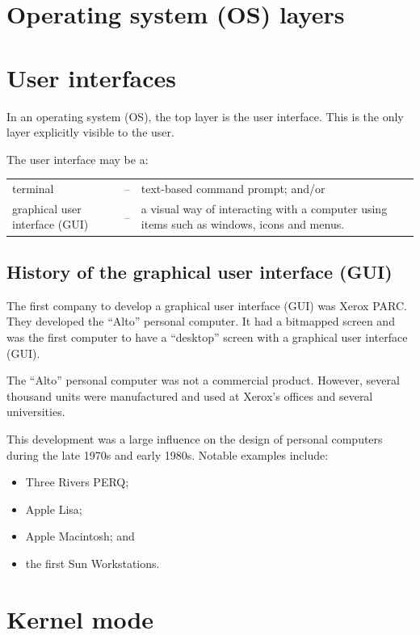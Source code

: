\documentclass[a4paper]{systems-software}
\begin{document}
\section{Operating system (OS) layers}

\section*{User interfaces}

In an operating system (OS), the top layer is the user interface. This is the only layer explicitly visible to the user.

The user interface may be a:
\begin{longtabu} to \textwidth {X[6,l] X[1,c] X[10,l]}
	\textbullet terminal & -- & text-based command prompt; and/or
	\\
	\textbullet graphical user interface (GUI) & -- & a visual way of interacting with a computer using items such as windows, icons and menus.
\end{longtabu}


\subsection*{History of the graphical user interface (GUI)}

The first company to develop a graphical user interface (GUI) was Xerox PARC. They developed the “Alto” personal computer. It had a bitmapped screen and was the first computer to have a “desktop” screen with a graphical user interface (GUI).

The “Alto” personal computer was not a commercial product. However, several thousand units were manufactured and used at Xerox’s offices and several universities.

This development was a large influence on the design of personal computers during the late 1970s and early 1980s. Notable examples include:
\begin{itemize}
	\item Three Rivers PERQ;
	\item Apple Lisa;
	\item Apple Macintosh; and
	\item the first Sun Workstations.
\end{itemize}


\section{Kernel mode}
\end{document}
